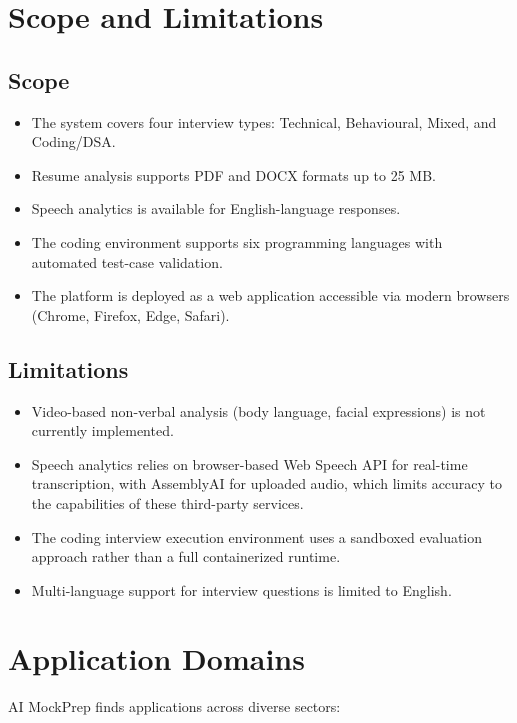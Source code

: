 \documentclass[12pt,a4paper,oneside]{report}
\begin{document}
\section{Scope and Limitations}
\label{sec:scope}

\subsection{Scope}
\begin{itemize}
  \item The system covers four interview types: Technical, Behavioural, Mixed, and Coding/DSA.
  \item Resume analysis supports PDF and DOCX formats up to 25 MB.
  \item Speech analytics is available for English-language responses.
  \item The coding environment supports six programming languages with automated test-case validation.
  \item The platform is deployed as a web application accessible via modern browsers (Chrome, Firefox, Edge, Safari).
\end{itemize}

\subsection{Limitations}
\begin{itemize}
  \item Video-based non-verbal analysis (body language, facial expressions) is not currently implemented.
  \item Speech analytics relies on browser-based Web Speech API for real-time transcription, with AssemblyAI for uploaded audio, which limits accuracy to the capabilities of these third-party services.
  \item The coding interview execution environment uses a sandboxed evaluation approach rather than a full containerized runtime.
  \item Multi-language support for interview questions is limited to English.
\end{itemize}


\section{Application Domains}
\label{sec:applications}

AI MockPrep finds applications across diverse sectors:
\end{document}
